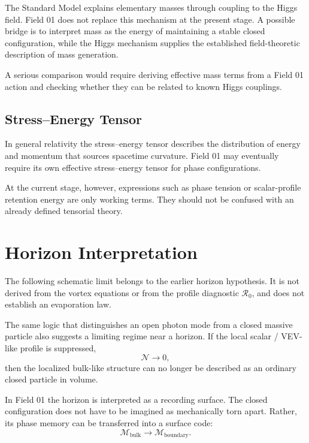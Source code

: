 \documentclass[11pt,a4paper]{article}
\newcommand{\normal}{\mathcal{N}}
\newcommand{\memory}{\mathcal{M}}
\begin{document}
The Standard Model explains elementary masses through coupling to the Higgs field. Field 01 does not replace this mechanism at the present stage. A possible bridge is to interpret mass as the energy of maintaining a stable closed configuration, while the Higgs mechanism supplies the established field-theoretic description of mass generation.

A serious comparison would require deriving effective mass terms from a Field 01 action and checking whether they can be related to known Higgs couplings.

\subsection*{Stress--Energy Tensor}

In general relativity the stress--energy tensor describes the distribution of energy and momentum that sources spacetime curvature. Field 01 may eventually require its own effective stress--energy tensor for phase configurations.

At the current stage, however, expressions such as phase tension or scalar-profile retention energy are only working terms. They should not be confused with an already defined tensorial theory.

\section{Horizon Interpretation}

The following schematic limit belongs to the earlier horizon hypothesis. It is not derived from the vortex equations or from the profile diagnostic $\mathcal{R}_0$, and does not establish an evaporation law.

The same logic that distinguishes an open photon mode from a closed massive particle also suggests a limiting regime near a horizon. If the local scalar / VEV-like profile is suppressed,
\begin{equation}
\normal \rightarrow 0,
\end{equation}
then the localized bulk-like structure can no longer be described as an ordinary closed particle in volume.

In Field 01 the horizon is interpreted as a recording surface. The closed configuration does not have to be imagined as mechanically torn apart. Rather, its phase memory can be transferred into a surface code:
\begin{equation}
\memory_{\mathrm{bulk}} \longrightarrow \memory_{\mathrm{boundary}}.
\end{equation}
\end{document}
